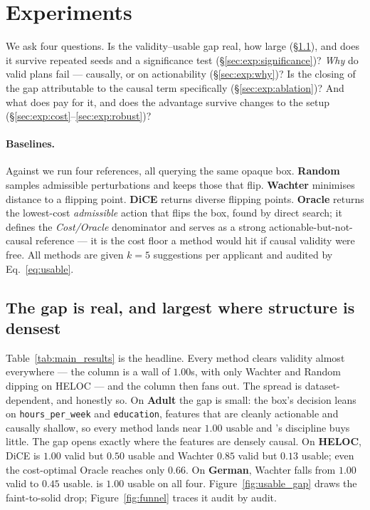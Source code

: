 \section{Experiments}
\label{sec:experiments}

We ask four questions. Is the validity--usable gap real, how large
(\S\ref{sec:exp:gap}), and does it survive repeated seeds and a significance test
(\S\ref{sec:exp:significance})? \emph{Why} do valid plans fail --- causally, or on
actionability (\S\ref{sec:exp:why})? Is the closing of the gap attributable to the
causal term specifically (\S\ref{sec:exp:ablation})? And what does \cac{} pay for
it, and does the advantage survive changes to the setup
(\S\ref{sec:exp:cost}--\ref{sec:exp:robust})?

\paragraph{Baselines.} Against \cac{} we run four references, all querying the same
opaque box. \textbf{Random} samples admissible perturbations and keeps those that
flip. \textbf{Wachter} \citep{wachter2017counterfactual} minimises distance to a
flipping point. \textbf{DiCE} \citep{mothilal2020dice} returns diverse flipping
points. \textbf{Oracle} returns the lowest-cost \emph{admissible} action that
flips the box, found by direct search; it defines the \emph{Cost/Oracle}
denominator and serves as a strong actionable-but-not-causal reference --- it is
the cost floor a method would hit if causal validity were free. All methods are
given $k=5$ suggestions per applicant and audited by
Eq.~\eqref{eq:usable}.

\subsection{The gap is real, and largest where structure is densest}
\label{sec:exp:gap}
Table~\ref{tab:main_results} is the headline. Every method clears validity almost
everywhere --- the column is a wall of $1.00$s, with only Wachter and Random
dipping on HELOC --- and the \Usable{} column then fans out. The spread is
dataset-dependent, and honestly so. On \textbf{Adult} the gap is small: the box's
decision leans on \texttt{hours\_per\_week} and \texttt{education}, features that
are cleanly actionable and causally shallow, so every method lands near
$1.00$ usable and \cac{}'s discipline buys little. The gap opens exactly where the
features are densely causal. On \textbf{HELOC}, DiCE is $1.00$ valid but $0.50$
usable and Wachter $0.85$ valid but $0.13$ usable; even the cost-optimal Oracle
reaches only $0.66$. On \textbf{German}, Wachter falls from $1.00$ valid to $0.45$
usable. \cac{} is $1.00$ usable on all four. Figure~\ref{fig:usable_gap} draws the
faint-to-solid drop; Figure~\ref{fig:funnel} traces it audit by audit.

